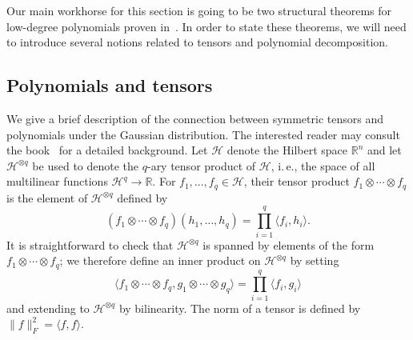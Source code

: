 \documentclass[11pt]{article}
\numberwithin{equation}{section}
\theoremstyle{definition}
\theoremstyle{plain}
\newcommand{\R}{\mathbb R}
\newcommand{\ie}{i.\,e.}
\newcommand{\inr}[2]{\langle #1, #2 \rangle}
\begin{document}
Our main workhorse for this section is going to be two structural theorems for
low-degree polynomials proven in~\cite{DS14}. In order to state these theorems,
we will need to introduce several notions related to tensors and polynomial decomposition.

\subsection{Polynomials and tensors}
We give a brief description of the connection between symmetric tensors and polynomials under the Gaussian distribution. The interested reader may consult the book~\cite{Janson:97} for a detailed background. 
Let $\mathcal{H}$ denote the Hilbert space $\mathbb{R}^n$ and let
$\mathcal{H}^{\otimes q}$ be used to denote the $q$-ary tensor product of
$\mathcal{H}$, \ie, the space of all multilinear functions $\mathcal{H}^q \to \R$.
For $f_1, \dots, f_q \in \mathcal{H}$, their tensor product $f_1 \otimes \cdots \otimes f_q$
is the element of $\mathcal{H}^{\otimes q}$ defined by
\[
    (f_1 \otimes \cdots \otimes f_q)(h_1, \dots, h_q) = \prod_{i=1}^q \inr{f_i}{h_i}.
\]
It is straightforward to check that $\mathcal{H}^{\otimes q}$ is spanned
by elements of the form $f_1 \otimes \cdots \otimes f_q$; we therefore define
an inner product on $\mathcal{H}^{\otimes q}$ by setting
\[
    \inr{f_1 \otimes \cdots \otimes f_q}{g_1 \otimes \cdots \otimes g_q} = \prod_{i=1}^q \inr{f_i}{g_i}
\]
and extending to $\mathcal{H}^{\otimes q}$ by bilinearity.
The norm of a tensor is defined by $\|f\|_F^2 = \inr{f}{f}$. 
\end{document}
